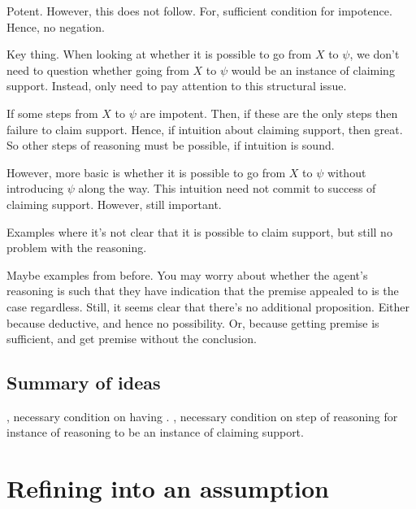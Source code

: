 \begin{note}
  Potent.
  However, this does not follow.
  For, sufficient condition for impotence.
  Hence, no negation.
\end{note}

\begin{note}
  Key thing.
  When looking at whether it is possible to go from \(X\) to \(\psi\), we don't need to question whether going from \(X\) to \(\psi\) would be an instance of claiming support.
  Instead, only need to pay attention to this structural issue.
\end{note}

\begin{note}
  If some steps from \(X\) to \(\psi\) are impotent.
  Then, if these are the only steps then failure to claim support.
  Hence, if intuition about claiming support, then great.
  So other steps of reasoning must be possible, if intuition is sound.

  However, more basic is whether it is possible to go from \(X\) to \(\psi\) without introducing \(\psi\) along the way.
  This intuition need not commit to success of claiming support.
  However, still important.

  Examples where it's not clear that it is possible to claim support, but still no problem with the reasoning.

  Maybe examples from before.
  You may worry about whether the agent's reasoning is such that they have indication that the premise appealed to is the case regardless.
  Still, it seems clear that there's no additional proposition.
  Either because deductive, and hence no possibility.
  Or, because getting premise is sufficient, and get premise without the conclusion.
\end{note}

\subsection{Summary of ideas}
\label{sec:summary-1}

\begin{note}
  \ideaS{}, necessary condition on having \support{}.
  \ideaCS{}, necessary condition on step of reasoning for instance of reasoning to be an instance of claiming support.
\end{note}

\section{Refining \ideaCS{} into an assumption}
\label{sec:assumpt-from-ideas}

